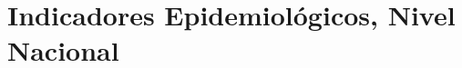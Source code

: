 \documentclass[xcolor=table]{beamer}
\begin{document}
	\section{Indicadores Epidemiológicos, Nivel Nacional}
%	
%
\end{document}
